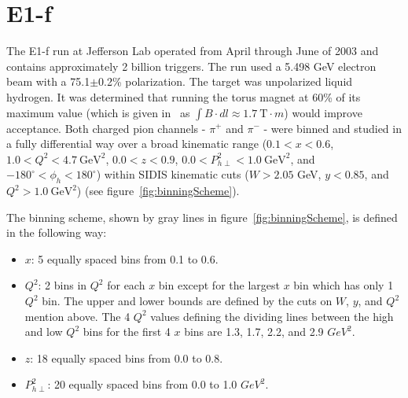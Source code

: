 \chapter{E1-f}
\label{cha:E1f}

The E1-f run at Jefferson Lab operated from April through June of 2003 and contains approximately 2 billion triggers.
The run used a 5.498 GeV electron beam with a 75.1$\pm$0.2\% polarization.
The target was unpolarized liquid hydrogen.
It was determined that running the torus magnet at 60\% of its maximum value (which is given in~\cite{Mecking03} as $\int B \cdot dl \approx 1.7\ \text{T} \cdot m$) would improve acceptance.
Both charged pion channels - $\pi^+$ and $\pi^-$ - were binned and studied in a fully differential way over a broad kinematic range ($0.1 < x < 0.6$, $1.0 < Q^2 < 4.7\ \text{GeV}^2$, $0.0 < z < 0.9$, $0.0 < P_{h\perp}^2 < 1.0\ \text{GeV}^2$, and $-180^\circ < \phi_h < 180^\circ$) within SIDIS kinematic cuts ($W > 2.05$ GeV, $y < 0.85$, and $Q^2 > 1.0\ \text{GeV}^2$) (see figure~\ref{fig:binningScheme}).

The binning scheme, shown by gray lines in figure~\ref{fig:binningScheme}, is defined in the following way:
\begin{itemize}
\item $x$: 5 equally spaced bins from 0.1 to 0.6.
\item $Q^2$: 2 bins in $Q^2$ for each $x$ bin except for the largest $x$ bin which has only 1 $Q^2$ bin. The upper and lower bounds are defined by the cuts on $W$, $y$, and $Q^2$ mention above. The 4 $Q^2$ values defining the dividing lines between the high and low $Q^2$ bins for the first 4 $x$ bins are 1.3, 1.7, 2.2, and 2.9 $GeV^2$.
\item $z$: 18 equally spaced bins from 0.0 to 0.8.
\item $P_{h\perp}^2$: 20 equally spaced bins from 0.0 to 1.0 $GeV^2$.
\end{itemize}

